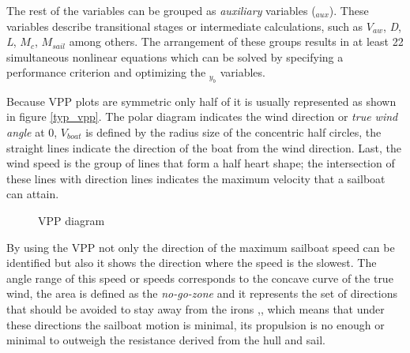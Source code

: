 
The rest of the variables can be grouped as \textit{auxiliary} variables (\textit{$_{aux}$}). These variables describe transitional stages or intermediate calculations, such as $V_{aw}$, \textit{D}, \textit{L}, $M_{c}$, $M_{sail}$ among others. The arrangement of these groups results in at least 22 simultaneous nonlinear equations which can be solved by specifying a performance criterion and optimizing the \textit{$_{y_{b}}$} variables.
 
Because VPP plots are symmetric only half of it is usually represented as shown in figure \ref {typ_vpp}. The polar diagram indicates the wind direction or \textit{true wind angle} at 0\degree , $V_{boat}$ is defined by the radius size of the concentric half circles, the straight lines indicate the direction of the boat from the wind direction. Last, the wind speed is the group of lines that form a half heart shape; the intersection of these lines with direction lines indicates the maximum velocity that a sailboat can attain. \par 
\begin{figure} %
  \centering
  \hfill
  \caption{VPP diagram}
\label{vpp_diag} 
\end{figure}

By using the VPP not only the direction of the maximum sailboat speed can be identified but also it shows the direction where the speed is the slowest. The angle range of this speed or speeds corresponds to the concave curve of the true wind, the area is defined as the \textit{no-go-zone} and it represents the set of directions that should be avoided to stay away from the irons \cite{yang2011control},\cite{denny2009float}, which means that under these directions the sailboat  motion is minimal, its propulsion is no enough or minimal to outweigh the resistance derived from the hull and sail.\par 

